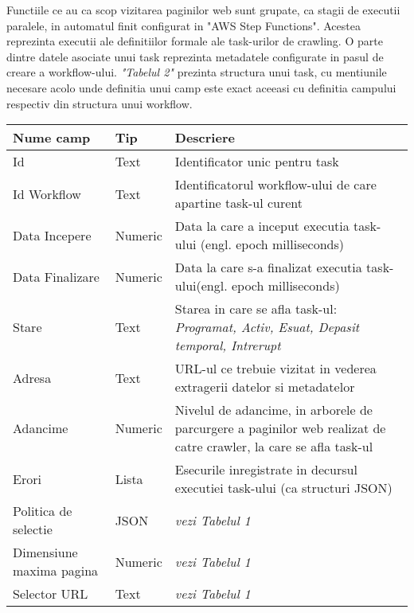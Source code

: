 Functiile ce au ca scop vizitarea paginilor web sunt grupate, ca stagii de executii paralele, in automatul finit configurat in "AWS Step Functions". Acestea reprezinta executii ale definitiilor formale ale task-urilor de crawling. O parte dintre datele asociate unui task reprezinta metadatele configurate in pasul de creare a workflow-ului. \textit{"Tabelul 2"} prezinta structura unui task, cu mentiunile necesare acolo unde definitia unui camp este exact aceeasi cu definitia campului respectiv din structura unui workflow.

\begin{table}[h]
	\centering
    \begin{tabular}{|M{2.5cm}|M{1.6cm}|M{9cm}|}
    	\hline 
    	Nume camp & Tip & Descriere \\ \hline
    	
    	Id & Text & Identificator unic pentru task \\ \hline
    	
    	Id Workflow & Text & Identificatorul workflow-ului de care apartine task-ul curent \\ \hline
    	
    	Data Incepere & Numeric & Data la care a inceput executia task-ului (engl. epoch milliseconds) \\ \hline
    	
    	Data Finalizare & Numeric & Data la care s-a finalizat executia task-ului(engl. epoch milliseconds) \\ \hline
    	
    	Stare & Text & Starea in care se afla task-ul: \textit{Programat, Activ, Esuat, Depasit temporal, Intrerupt} \\ \hline
    	
		Adresa & Text & URL-ul ce trebuie vizitat in vederea extragerii datelor si metadatelor \\ \hline    	
    	
    	Adancime & Numeric & Nivelul de adancime, in arborele de parcurgere a paginilor web realizat de catre crawler, la care se afla task-ul \\ \hline
    	
    	Erori & Lista & Esecurile inregistrate in decursul executiei task-ului (ca structuri JSON) \\ \hline
    	
    	Politica de selectie & JSON & \textit{vezi Tabelul 1} \\ \hline
    	
    	Dimensiune maxima pagina & Numeric & \textit{vezi Tabelul 1} \\ \hline
    	
    	Selector URL & Text & \textit{vezi Tabelul 1} \\ \hline
    	
    \end{tabular}
\end{table}
\clearpage

